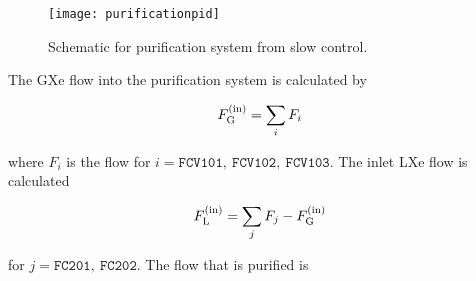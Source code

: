 \begin{table}
\centering
{}
\caption{Parameters queried from slow control system to calculate $\mathrm{F_G}$ and $\mathrm{F_L}$.  Those in
 are highlighted in the color listed.}
\label{tab:electron_lifetime_model_removal_slow_control_pars}
\end{table}

\begin{figure}
\centering
\texttt{[image: purificationpid]}
\caption{Schematic for purification system from slow control.}
\label{fig:electron_lifetime_model_slow_control_pur}
\end{figure}

The GXe flow into the purification system is calculated by

\begin{equation}
F_{\mathrm{G}}^{(\mathrm{in})} = \sum_i F_i
\end{equation}

\noindent where $F_i$ is the flow for $i = \mathtt{FCV101,\ FCV102,\ FCV103}$.  The inlet LXe flow is calculated

\begin{equation}
F_{\mathrm{L}}^{(\mathrm{in})} = \sum_j F_j - F_{\mathrm{G}}^{(\mathrm{in})}
\end{equation}

\noindent for $j = \mathtt{FC201,\ FC202}$.  The flow that is purified is

